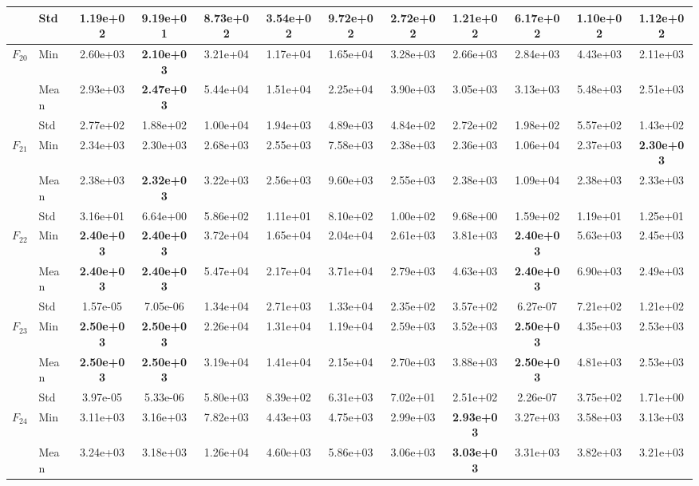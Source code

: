 \begin{center}
\begin{longtable}{clcccccccccc}
 & Std & 1.19e+02 & 9.19e+01 & 8.73e+02 & 3.54e+02 & 9.72e+02 & 2.72e+02 & 1.21e+02 & 6.17e+02 & 1.10e+02 & 1.12e+02 \\
\midrule
\multirow{3}{*}{$F_{20}$} & Min & 2.60e+03 & \textbf{2.10e+03} & 3.21e+04 & 1.17e+04 & 1.65e+04 & 3.28e+03 & 2.66e+03 & 2.84e+03 & 4.43e+03 & 2.11e+03 \\
 & Mean & 2.93e+03 & \textbf{2.47e+03} & 5.44e+04 & 1.51e+04 & 2.25e+04 & 3.90e+03 & 3.05e+03 & 3.13e+03 & 5.48e+03 & 2.51e+03 \\
 & Std & 2.77e+02 & 1.88e+02 & 1.00e+04 & 1.94e+03 & 4.89e+03 & 4.84e+02 & 2.72e+02 & 1.98e+02 & 5.57e+02 & 1.43e+02 \\
\midrule
\multirow{3}{*}{$F_{21}$} & Min & 2.34e+03 & 2.30e+03 & 2.68e+03 & 2.55e+03 & 7.58e+03 & 2.38e+03 & 2.36e+03 & 1.06e+04 & 2.37e+03 & \textbf{2.30e+03} \\
 & Mean & 2.38e+03 & \textbf{2.32e+03} & 3.22e+03 & 2.56e+03 & 9.60e+03 & 2.55e+03 & 2.38e+03 & 1.09e+04 & 2.38e+03 & 2.33e+03 \\
 & Std & 3.16e+01 & 6.64e+00 & 5.86e+02 & 1.11e+01 & 8.10e+02 & 1.00e+02 & 9.68e+00 & 1.59e+02 & 1.19e+01 & 1.25e+01 \\
\midrule
\multirow{3}{*}{$F_{22}$} & Min & \textbf{2.40e+03} & \textbf{2.40e+03} & 3.72e+04 & 1.65e+04 & 2.04e+04 & 2.61e+03 & 3.81e+03 & \textbf{2.40e+03} & 5.63e+03 & 2.45e+03 \\
 & Mean & \textbf{2.40e+03} & \textbf{2.40e+03} & 5.47e+04 & 2.17e+04 & 3.71e+04 & 2.79e+03 & 4.63e+03 & \textbf{2.40e+03} & 6.90e+03 & 2.49e+03 \\
 & Std & 1.57e-05 & 7.05e-06 & 1.34e+04 & 2.71e+03 & 1.33e+04 & 2.35e+02 & 3.57e+02 & 6.27e-07 & 7.21e+02 & 1.21e+02 \\
\midrule
\multirow{3}{*}{$F_{23}$} & Min & \textbf{2.50e+03} & \textbf{2.50e+03} & 2.26e+04 & 1.31e+04 & 1.19e+04 & 2.59e+03 & 3.52e+03 & \textbf{2.50e+03} & 4.35e+03 & 2.53e+03 \\
 & Mean & \textbf{2.50e+03} & \textbf{2.50e+03} & 3.19e+04 & 1.41e+04 & 2.15e+04 & 2.70e+03 & 3.88e+03 & \textbf{2.50e+03} & 4.81e+03 & 2.53e+03 \\
 & Std & 3.97e-05 & 5.33e-06 & 5.80e+03 & 8.39e+02 & 6.31e+03 & 7.02e+01 & 2.51e+02 & 2.26e-07 & 3.75e+02 & 1.71e+00 \\
\midrule
\multirow{3}{*}{$F_{24}$} & Min & 3.11e+03 & 3.16e+03 & 7.82e+03 & 4.43e+03 & 4.75e+03 & 2.99e+03 & \textbf{2.93e+03} & 3.27e+03 & 3.58e+03 & 3.13e+03 \\
 & Mean & 3.24e+03 & 3.18e+03 & 1.26e+04 & 4.60e+03 & 5.86e+03 & 3.06e+03 & \textbf{3.03e+03} & 3.31e+03 & 3.82e+03 & 3.21e+03 \\

\end{longtable}
\end{center}
